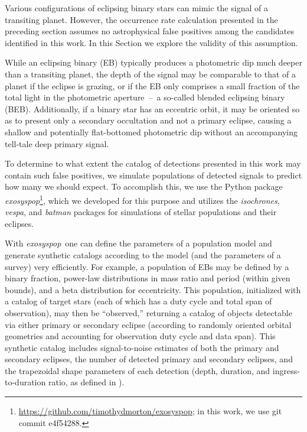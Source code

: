 \documentclass[manuscript, letterpaper]{aastex6}
\makeatletter
\let\origsection\section
\renewcommand\section{\@ifstar{\starsection}{\nostarsection}}
\newcommand\nostarsection[1]{\sectionprelude\origsection{#1}}
\newcommand\starsection[1]{\sectionprelude\origsection*{#1}}
\newcommand\sectionprelude{\vspace{1em}}
\newcommand{\project}[1]{\textsl{#1}}
\newcommand{\exosyspop}{\project{exosyspop}}
\newcommand{\sectlabel}[1]{\label{sect:#1}}
\makeatother
\begin{document}
\section{Astrophysical false positives}\sectlabel{false-positives}


Various configurations of eclipsing binary stars can mimic the signal of a
transiting planet.  However, the occurrence rate calculation
presented in the preceding section assumes no astrophysical false positives
among the candidates identified in this work.  In this Section we explore the
validity of this assumption.

While an eclipsing binary (EB) typically produces a photometric dip much
deeper than a transiting planet, the depth of the signal may be comparable to
that of a planet if the eclipse is grazing, or if the EB only comprises a small
fraction of the total light in the photometric aperture~--~a so-called blended
eclipsing binary (BEB).  Additionally, if a binary star has an eccentric
orbit, it may be oriented so as to present only a secondary occultation and
not a primary eclipse, causing a shallow and potentially flat-bottomed
photometric dip without an accompanying tell-tale deep primary signal.

To determine to what extent the catalog of detections presented in this work
may contain such false positives, we simulate populations of detected signals
to predict how many we should expect.  To accomplish this, we use the Python
package
\exosyspop\footnote{\url{https://github.com/timothydmorton/exosyspop}; in this
work, we use git commit \textsf{e4f54288}.}, which
we developed for this purpose and utilizes the \project{isochrones}, \project{vespa},
and \project{batman} packages \citep{Morton:2015, Morton:2015b, Kreidberg:2015}
 for simulations of stellar populations and their eclipses.

With \exosyspop\, one can define the parameters of a population model and
generate synthetic catalogs according to the model (and the parameters of a
survey) very efficiently.  For example, a population of EBs may be defined by
a binary fraction, power-law distributions in mass ratio and period (within
given bounds), and a beta distribution for eccentricity.  This population,
initialized with a catalog of target stars (each of which has a duty cycle and
total span of observation), may then be ``observed,'' returning a catalog of
objects detectable via either primary or secondary eclipse (according to
randomly oriented orbital geometries and accounting for observation duty cycle
and data span).  This synthetic catalog includes signal-to-noise estimates of
both the primary and secondary eclipses, the number of detected primary and
secondary eclipses, and the trapezoidal shape parameters of each detection
(depth, duration, and ingress-to-duration ratio, as defined in
\citealt{Morton:2012}).
\end{document}
